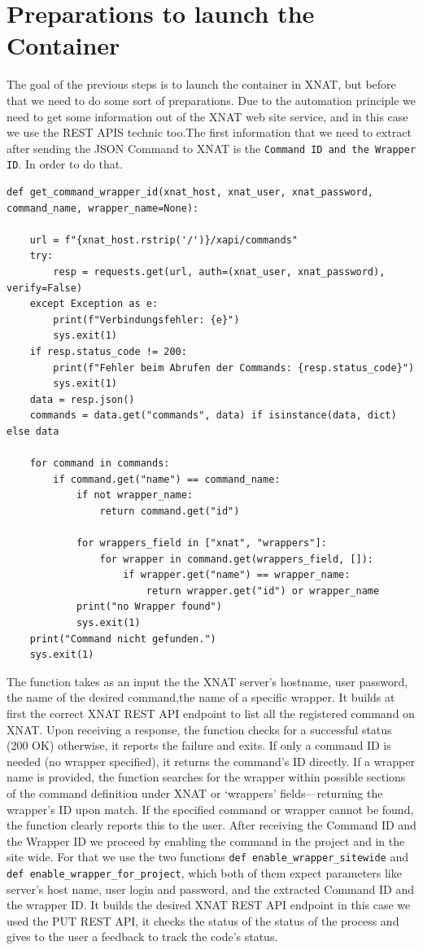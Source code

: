 \section{Preparations to launch the Container}
The goal of the previous steps is to launch the container in XNAT, but before that we need to do some sort of preparations. Due to the automation principle we need to get some information out of the XNAT web site service, and in this case we use the REST APIS technic too.The first information that we need to extract after sending the JSON Command to XNAT is the \texttt{Command ID and the Wrapper ID}.
In order to do that. 
 
\begin{lstlisting}
def get_command_wrapper_id(xnat_host, xnat_user, xnat_password, command_name, wrapper_name=None):
 
    url = f"{xnat_host.rstrip('/')}/xapi/commands"
    try:
        resp = requests.get(url, auth=(xnat_user, xnat_password), verify=False)
    except Exception as e:
        print(f"Verbindungsfehler: {e}")
        sys.exit(1)
    if resp.status_code != 200:
        print(f"Fehler beim Abrufen der Commands: {resp.status_code}")
        sys.exit(1)
    data = resp.json()
    commands = data.get("commands", data) if isinstance(data, dict) else data

    for command in commands:
        if command.get("name") == command_name:
            if not wrapper_name:
                return command.get("id")
            
            for wrappers_field in ["xnat", "wrappers"]:
                for wrapper in command.get(wrappers_field, []):
                    if wrapper.get("name") == wrapper_name:
                        return wrapper.get("id") or wrapper_name
            print("no Wrapper found")
            sys.exit(1)
    print("Command nicht gefunden.")
    sys.exit(1)
\end{lstlisting}
The function takes as an input the the XNAT server’s hostname, user password, the name of the desired command,the name of a specific wrapper. It builds at first the correct XNAT REST API endpoint to list all the registered command on XNAT.
Upon receiving a response, the function checks for a successful status (200 OK) otherwise, it reports the failure and exits. If only a command ID is needed (no wrapper specified), it returns the command’s ID directly. If a wrapper name is provided, the function searches for the wrapper within possible sections of the command definition under XNAT or ‘wrappers’ fields—returning the wrapper’s ID upon match. If the specified command or wrapper cannot be found, the function clearly reports this to the user.
After receiving the Command ID and the Wrapper ID we proceed by enabling the command in the project and in the site wide. For that we use the two functions \texttt{def enable\_wrapper\_sitewide} and \texttt{ def enable\_wrapper\_for\_project}, which both of them expect parameters like server’s host name, user login and  password, and the extracted Command ID and the wrapper ID. It builds the desired XNAT REST API endpoint in this case we used the PUT REST API, it checks the status of the status of the process and gives to the user a feedback to track the code's status.


